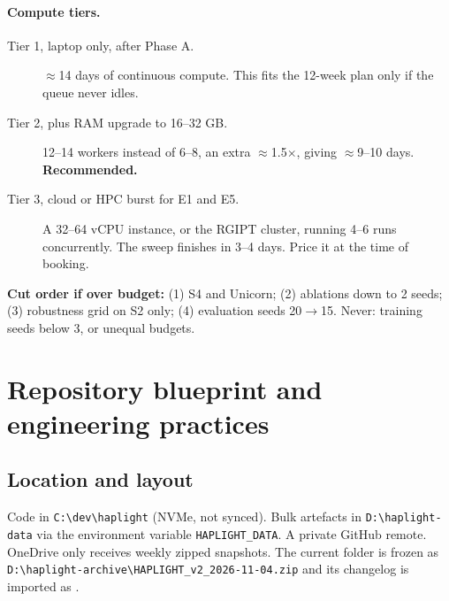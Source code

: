 \documentclass[11pt,a4paper]{article}
\newcommand{\file}[1]{\texttt{\detokenize{#1}}}
\begin{document}
\paragraph{Compute tiers.}
\begin{description}
\item[Tier 1, laptop only, after Phase A.] $\approx$14 days of continuous compute. This
  fits the 12-week plan only if the queue never idles.
\item[Tier 2, plus RAM upgrade to 16--32 GB.] 12--14 workers instead of 6--8, an extra
  $\approx$1.5$\times$, giving $\approx$9--10 days. \textbf{Recommended.}
\item[Tier 3, cloud or HPC burst for E1 and E5.] A 32--64 vCPU instance, or the RGIPT
  cluster, running 4--6 runs concurrently. The sweep finishes in 3--4 days. Price it at the
  time of booking.
\end{description}

\textbf{Cut order if over budget:} (1) S4 and Unicorn; (2) ablations down to 2 seeds;
(3) robustness grid on S2 only; (4) evaluation seeds 20$\to$15. Never: training seeds below 3,
or unequal budgets.

\section{Repository blueprint and engineering practices}
\label{sec:repo}
\subsection{Location and layout}
Code in \texttt{C:\textbackslash dev\textbackslash haplight} (NVMe, not synced). Bulk
artefacts in \texttt{D:\textbackslash haplight-data} via the environment variable
\texttt{HAPLIGHT\_DATA}. A private GitHub remote. OneDrive only receives weekly zipped
snapshots. The current folder is frozen as
\texttt{D:\textbackslash haplight-archive\textbackslash HAPLIGHT\_v2\_2026-11-04.zip} and
its changelog is imported as \file{docs/history/}.
\end{document}
